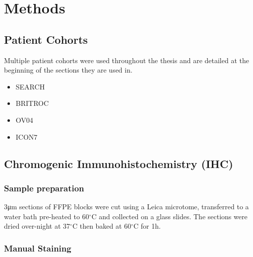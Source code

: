 
\chapter{Methods}  %

\ifpdf
    \graphicspath{{Methods/Figs/Raster/}{Methods/Figs/PDF/}{Methods/Figs/}}
\else
    \graphicspath{{Methods/Figs/Vector/}{Methods/Figs/}}
\fi


\section{Patient Cohorts} %

Multiple patient cohorts were used throughout the thesis and are detailed at the beginning of the sections they are used in. 

\begin{itemize}
    \item SEARCH
    \item BRITROC
    \item OV04
    \item ICON7
\end{itemize}

\section{Chromogenic Immunohistochemistry (IHC)}

\subsection{Sample preparation}
3μm sections of FFPE blocks were cut using a Leica microtome, transferred to a water bath pre-heated to 60${^\circ}$C and collected on a glass slides. The sections were dried over-night at 37${^\circ}$C then baked at 60${^\circ}$C for 1h. 

\subsection{Manual Staining} 
